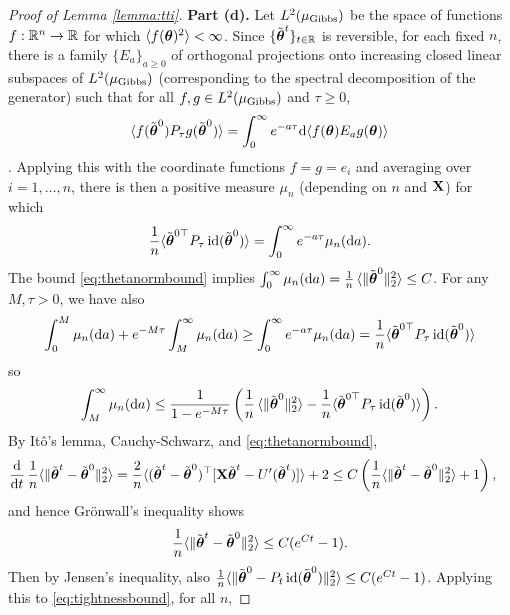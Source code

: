 \begin{proof}[Proof of Lemma \ref{lemma:tti}]
{\bf Part (d).} Let
$L^2(\mu_{\mathrm{Gibbs}})$ be the space of functions $f:\mathbb{R}^n \to \mathbb{R}$ for which
$\langle f(\boldsymbol{\theta})^2 \rangle<\infty$. Since
$\{\tilde{\boldsymbol{\theta}}^t\}_{t \in \mathbb{R}}$ is reversible, for each fixed $n$, there is a
family $\{E_a\}_{a \geq 0}$ of orthogonal projections onto increasing closed
linear subspaces of $L^2(\mu_{\mathrm{Gibbs}})$ (corresponding to the spectral
decomposition of the generator) such that for all $f,g \in
L^2(\mu_{\mathrm{Gibbs}})$ and $\tau \geq 0$,
\[\langle f(\tilde{\boldsymbol{\theta}}^0) P_\tau g(\tilde{\boldsymbol{\theta}}^0) \rangle
=\int_0^\infty e^{-a \tau} \mathrm{d} \langle f(\boldsymbol{\theta})E_a g(\boldsymbol{\theta})\rangle\]
\cite[Theorem A.4.2]{bakry2014analysis}. Applying this with the coordinate
functions $f=g=e_i$ and averaging over $i=1,\ldots,n$, there is
then a positive measure $\mu_n$ (depending on $n$ and $\mathbf{X}$) for which
\begin{equation}\label{eq:Ptaurepr}
\frac{1}{n}\langle {\tilde {\boldsymbol{\theta}}}^{0\top} P_\tau\operatorname{id}(\tilde
{\boldsymbol{\theta}}^0)\rangle=\int_0^\infty e^{-a\tau} \mu_n(\mathrm{d} a).
\end{equation}
The bound \eqref{eq:thetanormbound} implies
$\int_0^\infty \mu_n(\mathrm{d} a)=\frac{1}{n}\,\langle \|\tilde{\boldsymbol{\theta}}^0\|_2^2 \rangle \leq C$. For any $M,\tau>0$, we have also
\[\int_0^M \mu_n(\mathrm{d} a)+e^{-M\tau}\int_M^\infty \mu_n(\mathrm{d} a)
\geq \int_0^\infty e^{-a\tau} \mu_n(\mathrm{d} a)=
\frac{1}{n}\langle {\tilde {\boldsymbol{\theta}}}^{0\top} P_\tau \operatorname{id}(\tilde {\boldsymbol{\theta}}^0)
\rangle\]
so
\begin{equation}\label{eq:tightnessbound}
\int_M^\infty \mu_n(\mathrm{d} a)
\leq \frac{1}{1-e^{-M\tau}}\left(\frac{1}{n}\,\langle \|\tilde{\boldsymbol{\theta}}^0\|_2^2
\rangle-\frac{1}{n}\langle {\tilde {\boldsymbol{\theta}}}^{0\top} P_\tau
\operatorname{id}(\tilde {\boldsymbol{\theta}}^0) \rangle\right).
\end{equation}
By It\^o's lemma, Cauchy-Schwarz, and \eqref{eq:thetanormbound},
\begin{align*}
\frac{\mathrm{d}}{\mathrm{d} t}\,\frac{1}{n}\langle \|\tilde{\boldsymbol{\theta}}^t-\tilde{\boldsymbol{\theta}}^0\|_2^2 \rangle
&=\frac{2}{n}\langle (\tilde{\boldsymbol{\theta}}^t-\tilde{\boldsymbol{\theta}}^0)^\top[\mathbf{X}\tilde{\boldsymbol{\theta}}^t-U'(\tilde{\boldsymbol{\theta}}^t)]
\rangle+2
\leq C\left(\frac{1}{n}\langle \|\tilde{\boldsymbol{\theta}}^t-\tilde{\boldsymbol{\theta}}^0\|_2^2 \rangle+1\right),
\end{align*}
and hence Gr\"onwall's inequality shows
\begin{equation}\label{eq:thetatildeequicontinuous}
\frac{1}{n}\langle \|\tilde{\boldsymbol{\theta}}^t-\tilde{\boldsymbol{\theta}}^0\|_2^2 \rangle
\leq C(e^{Ct}-1).
\end{equation}
Then by Jensen's inequality, also
$\frac{1}{n}\langle \|\tilde{\boldsymbol{\theta}}^0-P_t \operatorname{id}(\tilde{\boldsymbol{\theta}}^0)\|_2^2 \rangle
\leq C(e^{Ct}-1)$. Applying this to \eqref{eq:tightnessbound}, for all $n$,

\end{proof}
